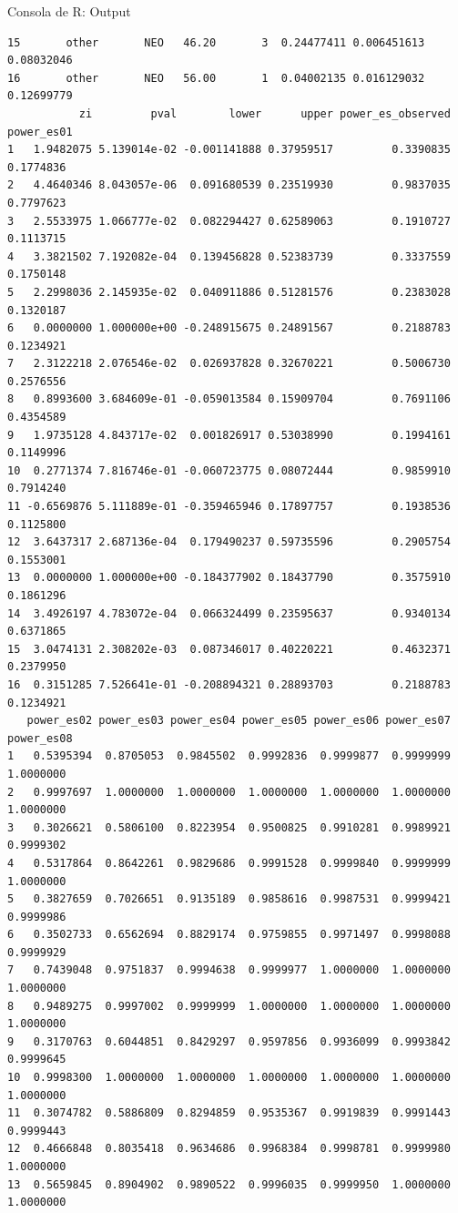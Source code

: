 \documentclass[
  bookmarksnumbered]{article}
\begin{document}
\begin{ROut}{Consola de R: Output~\thetcbcounter}
\begin{footnotesize}
\begin{verbatim}
15       other       NEO   46.20       3  0.24477411 0.006451613 0.08032046
16       other       NEO   56.00       1  0.04002135 0.016129032 0.12699779
           zi         pval        lower      upper power_es_observed power_es01
1   1.9482075 5.139014e-02 -0.001141888 0.37959517         0.3390835  0.1774836
2   4.4640346 8.043057e-06  0.091680539 0.23519930         0.9837035  0.7797623
3   2.5533975 1.066777e-02  0.082294427 0.62589063         0.1910727  0.1113715
4   3.3821502 7.192082e-04  0.139456828 0.52383739         0.3337559  0.1750148
5   2.2998036 2.145935e-02  0.040911886 0.51281576         0.2383028  0.1320187
6   0.0000000 1.000000e+00 -0.248915675 0.24891567         0.2188783  0.1234921
7   2.3122218 2.076546e-02  0.026937828 0.32670221         0.5006730  0.2576556
8   0.8993600 3.684609e-01 -0.059013584 0.15909704         0.7691106  0.4354589
9   1.9735128 4.843717e-02  0.001826917 0.53038990         0.1994161  0.1149996
10  0.2771374 7.816746e-01 -0.060723775 0.08072444         0.9859910  0.7914240
11 -0.6569876 5.111889e-01 -0.359465946 0.17897757         0.1938536  0.1125800
12  3.6437317 2.687136e-04  0.179490237 0.59735596         0.2905754  0.1553001
13  0.0000000 1.000000e+00 -0.184377902 0.18437790         0.3575910  0.1861296
14  3.4926197 4.783072e-04  0.066324499 0.23595637         0.9340134  0.6371865
15  3.0474131 2.308202e-03  0.087346017 0.40220221         0.4632371  0.2379950
16  0.3151285 7.526641e-01 -0.208894321 0.28893703         0.2188783  0.1234921
   power_es02 power_es03 power_es04 power_es05 power_es06 power_es07 power_es08
1   0.5395394  0.8705053  0.9845502  0.9992836  0.9999877  0.9999999  1.0000000
2   0.9997697  1.0000000  1.0000000  1.0000000  1.0000000  1.0000000  1.0000000
3   0.3026621  0.5806100  0.8223954  0.9500825  0.9910281  0.9989921  0.9999302
4   0.5317864  0.8642261  0.9829686  0.9991528  0.9999840  0.9999999  1.0000000
5   0.3827659  0.7026651  0.9135189  0.9858616  0.9987531  0.9999421  0.9999986
6   0.3502733  0.6562694  0.8829174  0.9759855  0.9971497  0.9998088  0.9999929
7   0.7439048  0.9751837  0.9994638  0.9999977  1.0000000  1.0000000  1.0000000
8   0.9489275  0.9997002  0.9999999  1.0000000  1.0000000  1.0000000  1.0000000
9   0.3170763  0.6044851  0.8429297  0.9597856  0.9936099  0.9993842  0.9999645
10  0.9998300  1.0000000  1.0000000  1.0000000  1.0000000  1.0000000  1.0000000
11  0.3074782  0.5886809  0.8294859  0.9535367  0.9919839  0.9991443  0.9999443
12  0.4666848  0.8035418  0.9634686  0.9968384  0.9998781  0.9999980  1.0000000
13  0.5659845  0.8904902  0.9890522  0.9996035  0.9999950  1.0000000  1.0000000

\end{verbatim}
\end{footnotesize}
\end{ROut}
\end{document}
